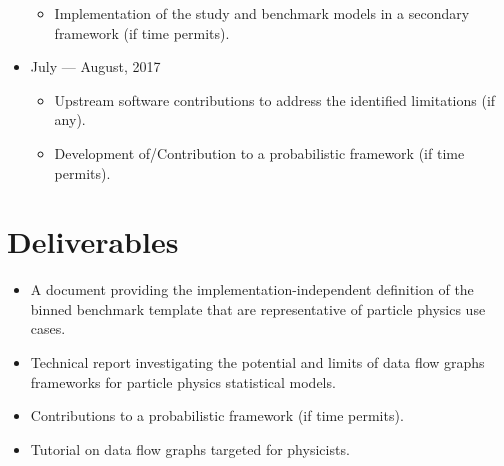 \begin{itemize}
\begin{itemize}
	      	\item Implementation of the study and benchmark models in a secondary framework (if time permits).
	      \end{itemize}
	\item July --- August, 2017
	      \begin{itemize}
	      	\item Upstream software contributions to address the identified limitations (if any).
	      	\item Development of/Contribution to a probabilistic framework (if time permits).
	      \end{itemize}
\end{itemize}

\section{Deliverables}

\begin{itemize}
	\item A document providing the implementation-independent definition of the binned benchmark template that are representative of particle physics use cases.
	\item Technical report investigating the potential and limits of data flow graphs frameworks for particle physics statistical models.
	\item Contributions to a probabilistic framework (if time permits).
	\item Tutorial on data flow graphs targeted for physicists.
\end{itemize}
